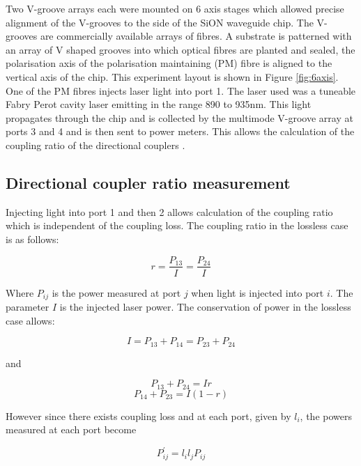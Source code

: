 Two V-groove arrays each were mounted on 6 axis stages which allowed precise
alignment of the V-grooves to the side of the SiON waveguide chip. The V-grooves
are commercially available arrays of fibres. A substrate is patterned with an
array of V shaped grooves into which optical fibres are planted and sealed, the polarisation axis
of the polarisation maintaining (PM) fibre is aligned to the vertical axis of the chip. This
experiment layout is shown in Figure \ref{fig:6axis}. One of the PM fibres
injects laser light into port 1. The laser used was a tuneable Fabry Perot
cavity laser emitting in the range 890 to 935nm. This light propagates through
the chip and is collected by the multimode V-groove array at ports 3 and 4 and
is then sent to power meters. This allows the calculation of the coupling ratio
of the directional couplers \cite{matthews2009manipulation}.

\subsection{Directional coupler ratio measurement}

Injecting light into port 1 and then 2 allows calculation of the coupling
ratio which is independent of the coupling loss. The coupling ratio in the
lossless case is as follows:

\begin{equation} r  = \frac{P_{13}}{I} = \frac{P_{24}}{I} \end{equation}

Where $P_{ij}$ is the power measured at port $j$ when light is injected into
port $i$. The parameter $I$ is the injected laser power. The conservation of
power in the lossless case allows:

\begin{equation} I = P_{13}+P_{14} = P_{23}+P_{24} \end{equation}

and

\begin{equation}\label{eqn:p1} P_{13}+P_{24} = Ir \end{equation}\label{eqn:p2}
\begin{equation} P_{14}+P_{23} = I(1-r) \end{equation}

However since there exists coupling loss and at each port, given by $l_i$, the
powers measured at each port become

\begin{equation} P^{'}_{ij} = l_i l_j P_{ij} \end{equation}

